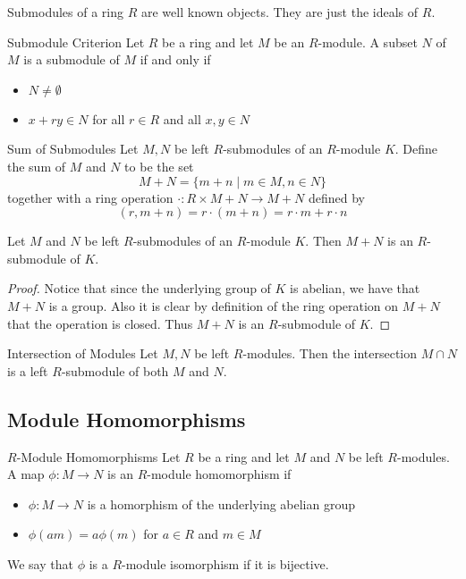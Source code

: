 \documentclass[a4paper]{article}
\begin{document}
Submodules of a ring $R$ are well known objects. They are just the ideals of $R$. 

\begin{prp}{Submodule Criterion}{} Let $R$ be a ring and let $M$ be an $R$-module. A subset $N$ of $M$ is a submodule of $M$ if and only if
\begin{itemize}
\item $N\neq\emptyset$
\item $x+ry\in N$ for all $r\in R$ and all $x,y\in N$
\end{itemize}
\end{prp}

\begin{defn}{Sum of Submodules}{} Let $M,N$ be left $R$-submodules of an $R$-module $K$. Define the sum of $M$ and $N$ to be the set $$M+N=\{m+n\;|\;m\in M,n\in N\}$$ together with a ring operation $\cdot:R\times M+N\to M+N$ defined by $$(r,m+n)=r\cdot(m+n)=r\cdot m+r\cdot n$$
\end{defn}

\begin{lmm}{}{} Let $M$ and $N$ be left $R$-submodules of an $R$-module $K$. Then $M+N$ is an $R$-submodule of $K$. \tcbline
\begin{proof}
Notice that since the underlying group of $K$ is abelian, we have that $M+N$ is a group. Also it is clear by definition of the ring operation on $M+N$ that the operation is closed. Thus $M+N$ is an $R$-submodule of $K$. 
\end{proof}
\end{lmm}

\begin{prp}{Intersection of Modules}{} Let $M,N$ be left $R$-modules. Then the intersection $M\cap N$ is a left $R$-submodule of both $M$ and $N$. 
\end{prp}

\subsection{Module Homomorphisms}
\begin{defn}{$R$-Module Homomorphisms}{} Let $R$ be a ring and let $M$ and $N$ be left $R$-modules. A map $\phi:M\to N$ is an $R$-module homomorphism if 
\begin{itemize}
\item $\phi:M\to N$ is a homorphism of the underlying abelian group
\item $\phi(am)=a\phi(m)$ for $a\in R$ and $m\in M$
\end{itemize}
We say that $\phi$ is a $R$-module isomorphism if it is bijective. 
\end{defn}
\end{document}
